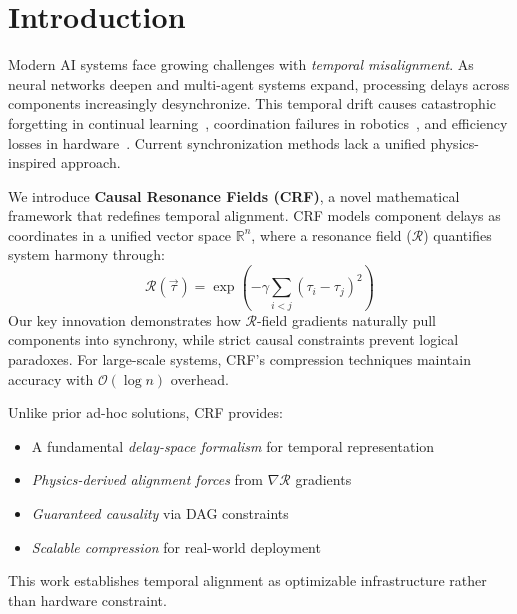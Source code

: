 \section{Introduction}
\label{sec:introduction}

Modern AI systems face growing challenges with \textit{temporal misalignment}. As neural networks deepen and multi-agent systems expand, processing delays across components increasingly desynchronize. This temporal drift causes catastrophic forgetting in continual learning~\cite{kirkpatrick2017}, coordination failures in robotics~\cite{shankar2022}, and efficiency losses in hardware~\cite{horowitz2014}. Current synchronization methods lack a unified physics-inspired approach.

We introduce \textbf{Causal Resonance Fields (CRF)}, a novel mathematical framework that redefines temporal alignment. CRF models component delays as coordinates in a unified vector space $\mathbb{R}^n$, where a resonance field ($\mathcal{R}$) quantifies system harmony through:
\[
\mathcal{R}(\vec{\tau}) = \exp\left(-\gamma \sum_{i<j} (\tau_i - \tau_j)^2\right)
\]
Our key innovation demonstrates how $\mathcal{R}$-field gradients naturally pull components into synchrony, while strict causal constraints prevent logical paradoxes. For large-scale systems, CRF's compression techniques maintain accuracy with $\mathcal{O}(\log n)$ overhead.

Unlike prior ad-hoc solutions, CRF provides:
\begin{itemize}
    \item A fundamental \textit{delay-space formalism} for temporal representation
    \item \textit{Physics-derived alignment forces} from $\nabla\mathcal{R}$ gradients
    \item \textit{Guaranteed causality} via DAG constraints
    \item \textit{Scalable compression} for real-world deployment
\end{itemize}
This work establishes temporal alignment as optimizable infrastructure rather than hardware constraint.